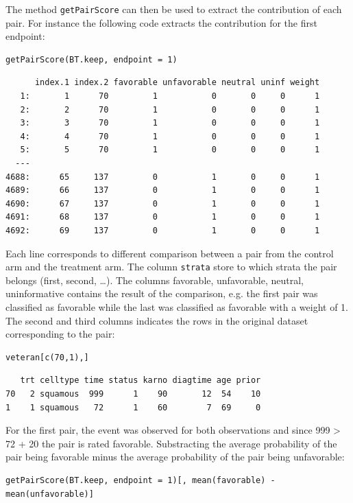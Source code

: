 \documentclass[12pt]{article}
\begin{document}
The method \texttt{getPairScore} can then be used to extract the contribution
of each pair. For instance the following code extracts the
contribution for the first endpoint:
\lstset{language=r,label= ,caption= ,captionpos=b,numbers=none}
\begin{lstlisting}
getPairScore(BT.keep, endpoint = 1)
\end{lstlisting}

\begin{verbatim}
      index.1 index.2 favorable unfavorable neutral uninf weight
   1:       1      70         1           0       0     0      1
   2:       2      70         1           0       0     0      1
   3:       3      70         1           0       0     0      1
   4:       4      70         1           0       0     0      1
   5:       5      70         1           0       0     0      1
  ---                                                           
4688:      65     137         0           1       0     0      1
4689:      66     137         0           1       0     0      1
4690:      67     137         0           1       0     0      1
4691:      68     137         0           1       0     0      1
4692:      69     137         0           1       0     0      1
\end{verbatim}

Each line corresponds to different comparison between a pair from the
control arm and the treatment arm. The column \texttt{strata} store to which
strata the pair belongs (first, second, \ldots{}). The columns favorable,
unfavorable, neutral, uninformative contains the result of the
comparison, e.g. the first pair was classified as favorable while the
last was classified as favorable with a weight of 1. The second and
third columns indicates the rows in the original dataset corresponding
to the pair:
\lstset{language=r,label= ,caption= ,captionpos=b,numbers=none}
\begin{lstlisting}
veteran[c(70,1),]
\end{lstlisting}

\begin{verbatim}
   trt celltype time status karno diagtime age prior
70   2 squamous  999      1    90       12  54    10
1    1 squamous   72      1    60        7  69     0
\end{verbatim}



For the first pair, the event was observed for both observations and
since 999 > 72 + 20 the pair is rated favorable. Substracting the
average probability of the pair being favorable minus the average
probability of the pair being unfavorable:
\lstset{language=r,label= ,caption= ,captionpos=b,numbers=none}
\begin{lstlisting}
getPairScore(BT.keep, endpoint = 1)[, mean(favorable) - mean(unfavorable)]
\end{lstlisting}
\end{document}
